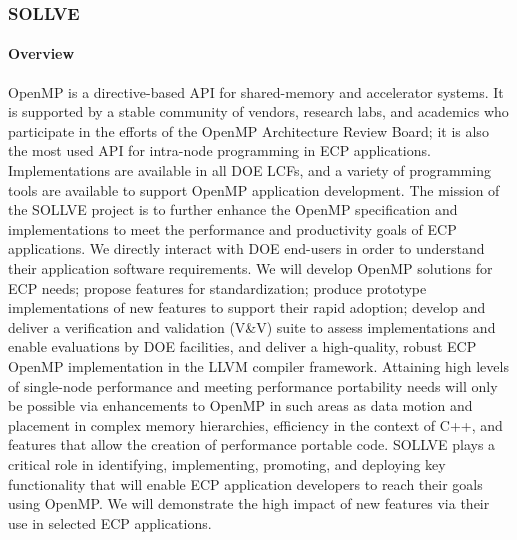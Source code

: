\subsubsection{ SOLLVE} \label{subsubsect:sollve}


\paragraph{Overview} 

OpenMP is a   directive-based API for shared-memory and accelerator systems. It
is supported by a stable community of vendors, research labs, and academics who
participate in the efforts of the  OpenMP Architecture Review Board; it   is
also the most used API for intra-node programming in ECP applications.
Implementations are available in all DOE LCFs, and a variety of programming
tools are available to support OpenMP application development. The mission of
the SOLLVE project is to further enhance the OpenMP specification and
implementations to meet the performance and productivity goals of ECP
applications. We directly interact with DOE end-users in order to understand
their application software requirements. We will develop OpenMP solutions for
ECP needs; propose features for standardization; produce prototype
implementations of new features to support their rapid adoption; develop and
deliver a verification and validation (V\&V) suite to assess implementations and
enable evaluations by DOE  facilities, and deliver a high-quality,  robust ECP
OpenMP implementation in the LLVM compiler framework. Attaining high levels of
single-node performance and meeting performance portability needs will only be
possible via enhancements to OpenMP in such areas as data motion and placement
in complex memory  hierarchies, efficiency in the context of C++,  and features
that allow the creation of performance portable code. SOLLVE plays a critical
role in identifying, implementing, promoting, and deploying key functionality
that will enable ECP application developers to reach their goals using OpenMP.
We will demonstrate the high impact of new features via their use in selected
ECP applications.

